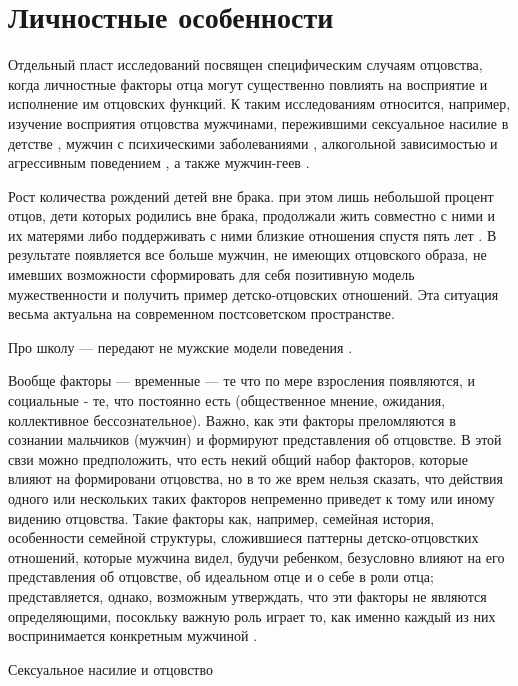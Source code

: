 \documentclass{../../common/thesisbyxetex}
\begin{document}
\section{Личностные особенности} 

Отдельный пласт исследований посвящен специфическим случаям отцовства, когда личностные факторы 
отца могут существенно повлиять на восприятие и исполнение им отцовских функций. К таким 
исследованиям относится, например, изучение восприятия отцовства мужчинами, пережившими сексуальное 
насилие в детстве \cite{sex}, мужчин с психическими заболеваниями \cite{gbi}, алкогольной 
зависимостью и агрессивным поведением \cite{alc}, а также мужчин-геев \cite{gay}.

Рост количества рождений детей вне брака. при этом лишь небольшой процент отцов, дети которых 
родились вне брака, продолжали жить совместно с ними и их матерями либо поддерживать с ними близкие 
отношения спустя пять лет \cite{long}. В результате появляется все больше мужчин, не имеющих 
отцовского образа, не имевших возможности сформировать для себя позитивную модель мужественности и 
получить пример детско-отцовских отношений. Эта ситуация весьма актуальна на современном 
постсоветском пространстве.

Про школу --- передают не мужские модели поведения \cite{md}.


Вообще факторы --- временные --- те что по мере взросления появляются, и социальные - те, что 
постоянно есть (общественное мнение, ожидания, коллективное бессознательное). Важно, как эти 
факторы преломляются в сознании мальчиков (мужчин) и формируют представления об отцовстве. В этой 
свзи можно предположить, что есть некий общий набор факторов, которые влияют на формировани 
отцовства, но в то же врем нельзя сказать, что действия одного или нескольких таких факторов 
непременно приведет к тому или иному видению отцовства. Такие факторы как, например, семейная 
история, особенности семейной структуры, сложившиеся паттерны детско-отцовстких отношений, 
которые мужчина видел, будучи ребенком, безусловно влияют на его представления об отцовстве, об 
идеальном отце и о себе в роли отца; представляется, однако, возможным утверждать, что эти 
факторы не являются определяющими, посокльку важную роль играет то, как именно каждый из них 
воспринимается конкретным мужчиной \cite[164]{long}. 

\cite[164]{long}

Сексуальное насилие и отцовство
\end{document}
